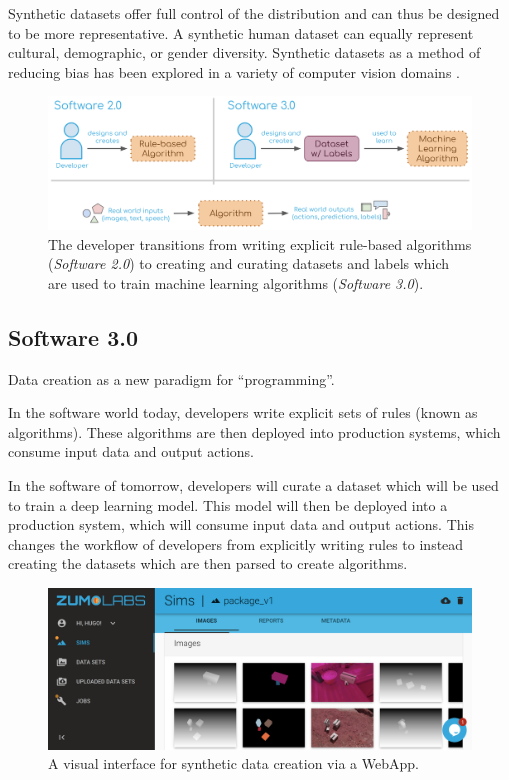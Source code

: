 \documentclass{article}
\begin{document}
Synthetic datasets offer full control of the distribution and can thus be designed to be more representative. A synthetic human dataset can equally represent cultural, demographic, or gender diversity. Synthetic datasets as a method of reducing bias has been explored in a variety of computer vision domains \cite{DBLP:journals/corr/abs-2004-13866}.

\begin{figure}
	\centering
	\includegraphics[width=\textwidth]{software3.png}
	\caption{The developer transitions from writing explicit rule-based algorithms (\emph{Software 2.0}) to creating and curating datasets and labels which are used to train machine learning algorithms (\emph{Software 3.0}).}
	\label{fig:fig2}
\end{figure}

\subsection{Software 3.0}
\label{sec:software3.0}

Data creation as a new paradigm for “programming”.

In the software world today, developers write explicit sets of rules (known as algorithms). These algorithms are then deployed into production systems, which consume input data and output actions.

In the software of tomorrow, developers will curate a dataset which will be used to train a deep learning model. This model will then be deployed into a production system, which will consume input data and output actions. This changes the workflow of developers from explicitly writing rules to instead creating the datasets which are then parsed to create algorithms.

\begin{figure}
	\centering
	\includegraphics[width=\textwidth]{webapp.png}
	\caption{A visual interface for synthetic data creation via a WebApp.}
	\label{fig:webapp}
\end{figure}
\end{document}
